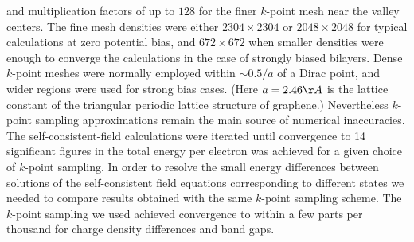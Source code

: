\documentclass[twocolumn,prb,showpacs,preprintnumbers,amsmath,amssymb]{revtex4}
\begin{document}
and multiplication factors of up to $128$ for the finer $k$-point mesh near the valley centers.  The fine mesh 
densities were either $2304 \times 2304$ or $2048 \times 2048$ for typical calculations
at zero potential bias, and $672 \times 672$ when smaller densities were enough to converge the 
calculations in the case of strongly biased bilayers.
Dense $k$-point meshes were normally employed within $\sim 0.5/a$ of a Dirac point, and wider 
regions were used for strong bias cases.  (Here $a = 2.46 \AA$ is the lattice constant
of the triangular periodic lattice structure of graphene.)  Nevertheless $k$-point sampling 
approximations remain the main source of numerical inaccuracies.
The self-consistent-field calculations were iterated until convergence to 14 significant figures 
in the total energy per electron was achieved for a given choice of $k$-point sampling.
In order to resolve the small energy differences between solutions of the self-consistent field equations 
corresponding to different states 
we needed to compare results obtained with the same $k$-point sampling scheme.
The $k$-point sampling we used achieved convergence to within a few parts per thousand
for charge density differences and band gaps.
\end{document}
